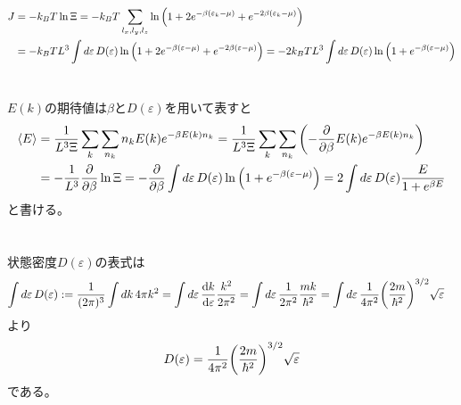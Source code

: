 \documentclass[../ap_2011.tex]{subfiles}
\begin{document}
\section{}
\begin{equation}\begin{aligned}[b]
    J &= -k_BT\ln\Xi = -k_BT\sum_{l_x,l_y,l_z}\ln\qty(1+2e^{-\beta(\varepsilon_k-\mu)}+e^{-2\beta(\varepsilon_k-\mu)})\\
    &= -k_BTL^3\int d\varepsilon\, D(\varepsilon)\ln\qty(1+2e^{-\beta(\varepsilon-\mu)}+e^{-2\beta(\varepsilon-\mu)})
    =-2k_BTL^3\int d\varepsilon\, D(\varepsilon)\ln\qty(1+e^{-\beta(\varepsilon-\mu)})
\end{aligned}\end{equation}


\section{}
\(E(k)\)の期待値は\(\beta\)と\(D(\varepsilon)\)を用いて表すと
\begin{equation}\begin{aligned}[b]
    \ev{E} &= \frac{1}{L^3\Xi}\sum_k\sum_{n_k}n_kE(k)e^{-\beta E(k)n_k}
    =\frac{1}{L^3\Xi}\sum_k\sum_{n_k}\qty(-\pdv{\beta}E(k)e^{-\beta E(k)n_k})\\
    &= -\frac{1}{L^3}\pdv{\beta}\ln\Xi
    = -\pdv{\beta}\int d\varepsilon\, D(\varepsilon)\ln\qty(1+e^{-\beta(\varepsilon-\mu)})
    =2\int d\varepsilon\, D(\varepsilon)\frac{E}{1+e^{\beta E}}
\end{aligned}\end{equation}
と書ける。


\section{}
状態密度\(D(\varepsilon)\)の表式は
\begin{equation}\begin{aligned}[b]
    \int d\varepsilon\,D(\varepsilon)
    &:=\frac{1}{(2\pi)^3}\int dk\,4\pi k^2
    =\int d\varepsilon\, \dv{k}{\varepsilon}\frac{k^2}{2\pi^2}
    =\int d\varepsilon\, \frac{1}{2\pi^2}\frac{mk}{\hbar^2}
    =\int d\varepsilon\, \frac{1}{4\pi^2}\qty(\frac{2m}{\hbar^2})^{3/2}\sqrt{\varepsilon}
\end{aligned}\end{equation}
より
\begin{equation}\begin{aligned}[b]
    D(\varepsilon)=\frac{1}{4\pi^2}\qty(\frac{2m}{\hbar^2})^{3/2}\sqrt{\varepsilon}
\end{aligned}\end{equation}
である。
\end{document}
